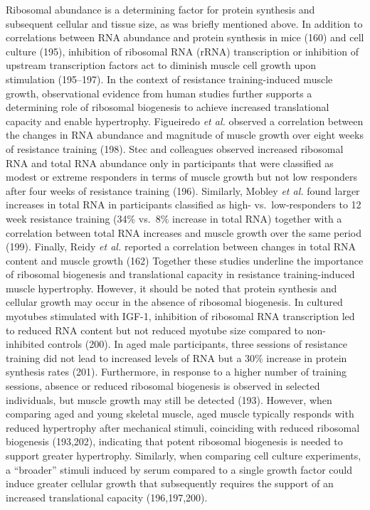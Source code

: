 \documentclass[twoside,10pt]{gihclass} %
\begin{document}
Ribosomal abundance is a determining factor for protein synthesis and subsequent cellular and tissue size, as was briefly mentioned above.
In addition to correlations between RNA abundance and protein synthesis in mice
(160)
and cell culture
(195),
inhibition of ribosomal RNA (rRNA) transcription or inhibition of upstream transcription factors act to diminish muscle cell growth upon stimulation
(195--197).
In the context of resistance training-induced muscle growth, observational evidence from human studies further supports a determining role of ribosomal biogenesis to achieve increased translational capacity and enable hypertrophy.
Figueiredo \emph{et al.} observed a correlation between the changes in RNA abundance and magnitude of muscle growth over eight weeks of resistance training
(198).
Stec and colleagues observed increased ribosomal RNA and total RNA abundance only in participants that were classified as modest or extreme responders in terms of muscle growth but not low responders after four weeks of resistance training
(196).
Similarly, Mobley \emph{et al.} found larger increases in total RNA in participants classified as high- vs.~low-responders to 12 week resistance training (34\% vs.~8\% increase in total RNA) together with a correlation between total RNA increases and muscle growth over the same period
(199).
Finally, Reidy \emph{et al.} reported a correlation between changes in total RNA content and muscle growth
(162)
Together these studies underline the importance of ribosomal biogenesis and translational capacity in resistance training-induced muscle hypertrophy.
However, it should be noted that protein synthesis and cellular growth may occur in the absence of ribosomal biogenesis.
In cultured myotubes stimulated with IGF-1, inhibition of ribosomal RNA transcription led to reduced RNA content but not reduced myotube size compared to non-inhibited controls
(200).
In aged male participants, three sessions of resistance training did not lead to increased levels of RNA but a 30\% increase in protein synthesis rates
(201).
Furthermore, in response to a higher number of training sessions, absence or reduced ribosomal biogenesis is observed in selected individuals, but muscle growth may still be detected
(193).
However, when comparing aged and young skeletal muscle, aged muscle typically responds with reduced hypertrophy after mechanical stimuli, coinciding with reduced ribosomal biogenesis
(193,202),
indicating that potent ribosomal biogenesis is needed to support greater hypertrophy.
Similarly, when comparing cell culture experiments, a ``broader'' stimuli induced by serum compared to a single growth factor could induce greater cellular growth that subsequently requires the support of an increased translational capacity
(196,197,200).
\end{document}
